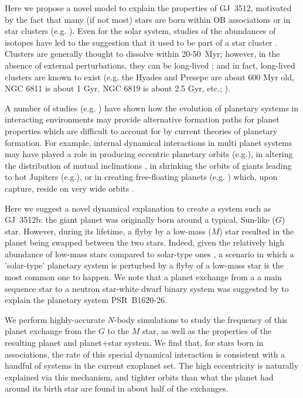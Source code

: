 \documentclass[twocolumn]{aastex62}
\begin{document}
Here we propose a novel model to explain the properties of GJ~3512,
motivated by the fact that many (if not most) stars are born within
OB associations or in star clusters (e.g. \citealt{
Lada2003}). Even for the solar system, studies of the abundances of isotopes have
led to the suggestion that it used to be part of a star cluster \citep{Adams2001}.  Clusters are
generally thought to dissolve within 20-50~Myr; however, in the absence of external perturbations, they can be long-lived \citep{deGrijs2009}; and in fact, long-lived clusters are known
to exist (e.g.  the Hyades and Presepe are about 600 Myr old, NGC 6811 is about 1 Gyr, NGC 6819 is about 2.5 Gyr, etc.;  \citealt{Meibom2015,meibom18}).


A number of studies (e.g.  \citealt{Heggie1996,Laughlin1998, Davies2001,Bonnell2001,Thies2005,Fregeau2006,Olczak2010,Chatterjee2012,Portegies2015,
Cai2017,Cai2018,Rice2018,Cai2019,
vanelteren2019, Flammini2019}) have shown how the evolution of planetary systems in
interacting environments may  provide alternative
formation paths for planet properties which are difficult to account for
by current theories of planetary formation.  For example, internal dynamical interactions in multi planet systems may have played a role in producing eccentric planetary orbits (e.g.\citealt{Rasio1996,Weidenschilling96,DelaFuente1997,Chatterjee2008, Juric2008, Beauge2012}), in altering the distribution of mutual inclinations \citep{Chatterjee2008,Boley2012}, in shrinking the orbits of giants leading to hot Jupiters (e.g.\citealt{Nagasawa08, Shara2016, Hamers2017}), or in creating free-floating planets (e.g. \citealt{Chatterjee2008, Juric2008}) which, upon capture, reside on very wide orbits \citep{Perets2012}.

Here we suggest a novel dynamical explanation to create a system such
as GJ~3512b: the giant planet was originally born around a typical,
Sun-like ($G$) star. However, during its lifetime, a flyby by a
low-mass ($M$) star resulted in the planet being swapped between the
two stars. 
Indeed, given the relatively high abundance of low-mass stars compared to solar-type ones \citep{Scalo1979}, a scenario in which a 'solar-type' planetary system is perturbed by a flyby of a low-mass star is the most common one to happen. We note that a planet exchange from a a main sequence star to a neutron star-white dwarf binary system was suggested by \citet{Fregeau2006} to explain the planetary system PSR~B1620-26.



We perform highly-accurate $N$-body simulations to study
the frequency of this planet exchange from the $G$ to the $M$ star, as
well as the properties of the resulting planet and planet+star system.
We find that, for stars born in associations, the rate of this special
dynamical interaction is consistent with a handful of systems in the
current exoplanet set. The high eccentricity is naturally explained
via this mechanism, and tighter orbits than what the planet had
around its birth star are found in about half of the exchanges.
\end{document}

